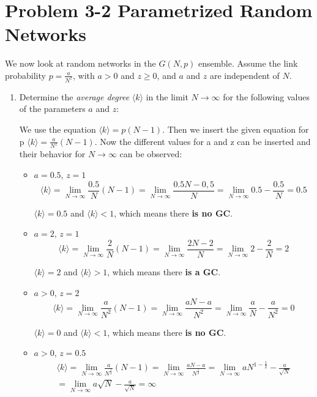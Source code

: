 \section{Problem 3-2 Parametrized Random Networks}

We now look at random networks in the $G(N,p)$ ensemble. Assume the link probability $p = \frac{a}{N^z}$, with $a > 0$ and $z \geq 0$, and $a$ and $z$ are independent of $N$.

\begin{enumerate}
	\item Determine the \textit{average degree} $\langle k \rangle$ in the limit $N \rightarrow \infty$ for the following values of the parameters $a$ and $z$:

	We use the equation $\langle k \rangle = p(N-1)$. Then we insert the given equation for p $\langle k \rangle = \frac{a}{N^z} (N-1)$. Now the different values for a and z can be inserted and their behavior for $N \rightarrow \infty$ can be observed:
	
	\begin{itemize}
		\item $a=0.5$,  $z=1$
			\begin{equation}
				\langle k \rangle = \lim\limits_{N \rightarrow \infty} \frac{0.5}{N}(N-1) = \lim\limits_{N \rightarrow \infty} \frac{0.5N - 0,5}{N} =\lim\limits_{N \rightarrow \infty} 0.5 - \frac{0.5}{N} = 0.5
			\end{equation}
			
			$\langle k \rangle = 0.5$ and $\langle k \rangle < 1$, which means there \textbf{is no GC}. 
		\item $a=2$,  $z=1$
			\begin{equation}
				\langle k \rangle = \lim\limits_{N \rightarrow \infty} \frac{2}{N}(N-1) = \lim\limits_{N \rightarrow \infty} \frac{2N - 2}{N} =\lim\limits_{N \rightarrow \infty} 2 - \frac{2}{N} = 2
			\end{equation}
			
			$\langle k \rangle = 2$ and $\langle k \rangle > 1$, which means there \textbf{is a GC}. 
		\item $a>0$,  $z=2$
			\begin{equation}
				\langle k \rangle = \lim\limits_{N \rightarrow \infty} \frac{a}{N^2}(N-1) = \lim\limits_{N \rightarrow \infty} \frac{aN - a}{N^2} =\lim\limits_{N \rightarrow \infty} \frac{a}{N} - \frac{a}{N^2} = 0
			\end{equation}
			
			$\langle k \rangle = 0$ and $\langle k \rangle < 1$, which means there \textbf{is no GC}. 
		\item $a>0$,  $z=0.5$
			\begin{equation}
			\begin{split}
				\langle k \rangle 
				= \lim\limits_{N \rightarrow \infty} \frac{a}{N^{\frac{1}{2}}}(N-1) 
				= \lim\limits_{N \rightarrow \infty} \frac{aN - a}{N^{\frac{1}{2}}}
				= \lim\limits_{N \rightarrow \infty} aN^{1-\frac{1}{2}} - \frac{a}{\sqrt{N}}  \\
				= \lim\limits_{N \rightarrow \infty} a\sqrt{N} - \frac{a}{\sqrt{N}} = \infty
			\end{split}
			\end{equation}
			

\end{itemize}
\end{enumerate}
